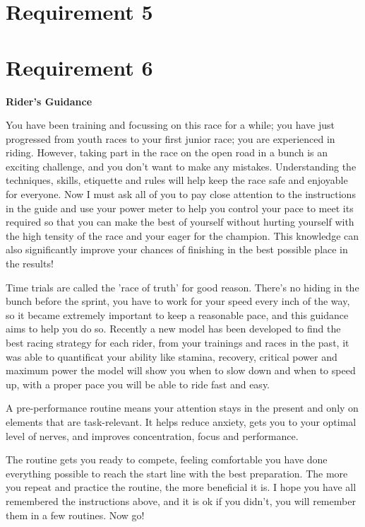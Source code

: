 \documentclass[12pt]{article}
\begin{document}
\section{Requirement 5}


\newpage
\section{Requirement 6}
\begin{center}
    \huge \textbf{Rider's Guidance}
\end{center}\large
You have been training and focussing on this race for a while; you  have just progressed from youth races to your first junior race; you are experienced in riding.
However, taking part in the race on the open road in a bunch is an exciting challenge, and you don't want to make any mistakes.
Understanding the techniques, skills, etiquette and rules will help keep the race safe and enjoyable for everyone. Now I must ask all of you to pay close attention to the instructions in the guide and use your power meter
to help you control your pace to meet its required so that you can make the best of yourself without hurting yourself with the high tensity of the race and your eager for
the champion. This knowledge can also significantly improve your chances of finishing in the best possible place in the results!

Time trials are called the 'race of truth' for good reason. There's no hiding in the bunch before the sprint, you have to work for your speed every inch of the way, so it
became extremely  important to keep a reasonable pace, and this guidance aims to help you do so.
Recently a new model has been developed to find the best racing strategy for each rider, from your trainings and races in the past, it was able to quantificat your ability
like stamina, recovery, critical power and maximum power the model will show you when to slow down and when to speed up, with a proper pace you will be able to ride
fast and easy.

A pre-performance routine means your attention stays in the present and only on elements that are task-relevant. It helps reduce anxiety, gets you to your optimal level
of nerves, and improves concentration, focus and performance.

The routine gets you ready to compete, feeling comfortable you have done everything possible to reach the start line with the best preparation. The more you repeat and
practice the routine, the more beneficial it is. I hope you have all remembered the instructions above, and it is ok if you didn't, you will remember them in a few routines.
Now go!


\end{document}

